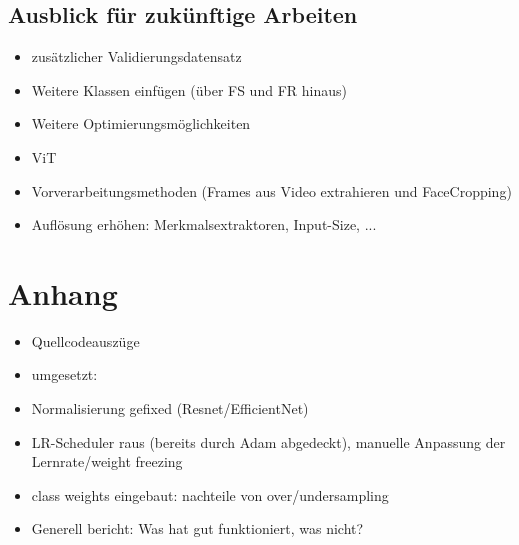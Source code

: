 \documentclass{article}
\begin{document}
    \subsection{Ausblick für zukünftige Arbeiten}
    \begin{itemize}
        \item zusätzlicher Validierungsdatensatz %
        \item Weitere Klassen einfügen (über FS und FR hinaus)
        \item Weitere Optimierungsmöglichkeiten
        \item ViT
        \item Vorverarbeitungsmethoden (Frames aus Video extrahieren und FaceCropping)
        \item Auflösung erhöhen: Merkmalsextraktoren, Input-Size, ...
    \end{itemize}

    
    

    \section*{Anhang}
    \begin{itemize}
        \item Quellcodeauszüge
        \item umgesetzt:
        \item Normalisierung gefixed (Resnet/EfficientNet)
        \item LR-Scheduler raus (bereits durch Adam abgedeckt), manuelle Anpassung der Lernrate/weight freezing
        \item class weights eingebaut: nachteile von over/undersampling
        \item Generell bericht: Was hat gut funktioniert, was nicht?
    \end{itemize}
\end{document}
